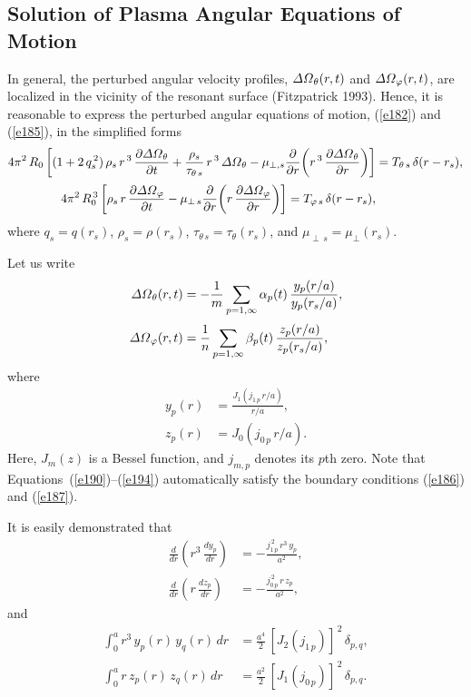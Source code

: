 \documentclass[notitlepage,12pt]{article}
\begin{document}
\subsection{Solution of Plasma Angular Equations of Motion}
In general, the perturbed angular velocity profiles, ${\mit\Delta\Omega}_\theta(r,t)$ and ${\mit\Delta\Omega}_\varphi(r,t)$, are
localized in the vicinity of the resonant surface (Fitzpatrick 1993). Hence, it is reasonable to express  the perturbed angular
equations of motion, (\ref{e182}) and (\ref{e185}), in the simplified  forms
\begin{align}\label{e188}
4\pi^2\,R_0\left[(1+2\,q_s^{\,2})\,\rho_s\,r^{\,3}\,\frac{\partial {\mit\Delta\Omega}_\theta}{\partial t}+ \frac{\rho_s}{\tau_{\theta\,s}}\,r^{\,3}\,{\mit\Delta\Omega}_\theta-\mu_{\perp,s}\frac{\partial}{\partial r}\!\left(r^{\,3}\,\frac{\partial{\mit\Delta\Omega}_\theta}{\partial r}\right)\right]
&=T_{\theta\,s}\,\delta(r-r_s),\\[0.5ex]
4\pi^2\,R_0^{\,3}\left[\rho_s\,r\,\frac{\partial {\mit\Delta\Omega}_\varphi}{\partial t}-\mu_{\perp\,s}\frac{\partial}{\partial r}\!\left(r\,\frac{\partial{\mit\Delta\Omega}_\varphi}{\partial r}\right)\right]
=T_{\varphi\,s}\,\delta(r-r_s),\label{e189}
\end{align}
where $q_s=q(r_s)$, $\rho_s=\rho(r_s)$, $\tau_{\theta\,s}=\tau_\theta(r_s)$, and $\mu_{\perp\,s}=\mu_\perp(r_s)$. 

Let us write
\begin{align}\label{e190}
{\mit\Delta\Omega}_\theta(r,t) &= - \frac{1}{m}\sum_{p=1,\infty} \alpha_p(t)\,\frac{y_p(r/a)}{y_p(r_s/a)},\\[0.5ex]
{\mit\Delta\Omega}_\varphi(r,t) &=  \frac{1}{n}\sum_{p=1,\infty} \beta_p(t)\,\frac{z_p(r/a)}{z_p(r_s/a)},\label{e191}
\end{align}
where
\begin{align}
y_p(r) &= \frac{J_1(j_{1\,p}\,r/a)}{r/a},\\[0.5ex]
z_p(r) &= J_0(j_{0\,p}\,r/a).\label{e194}
\end{align}
Here, $J_m(z)$ is a Bessel function, and $j_{m,p}$ denotes its $p$th zero. Note that
Equations~(\ref{e190})--(\ref{e194}) automatically satisfy the boundary conditions (\ref{e186}) and (\ref{e187}). 

It is easily demonstrated that 
\begin{align}
\frac{d}{dr}\!\left(r^{3}\,\frac{dy_p}{dr}\right)&= -\frac{j_{1\,p}^{\,2}\,r^{3}\,y_p}{a^{2}},\\[0.5ex]
\frac{d}{dr}\!\left(r\,\frac{dz_p}{dr}\right)&= -\frac{j_{0\,p}^{\,2}\,r\,z_p}{a^{2}},
\end{align}
and
\begin{align}
\int_0^a r^{3}\,y_p(r)\,y_q(r)\,dr &= \frac{a^{4}}{2}\,[J_2(j_{1\,p})]^{\,2}\,\delta_{p,q},\\[0.5ex]
\int_0^a r\,z_p(r)\,z_q(r)\,dr &= \frac{a^{2}}{2}\,[J_1(j_{0\,p})]^{\,2}\,\delta_{p,q}.\label{e197}
\end{align}
\end{document}
